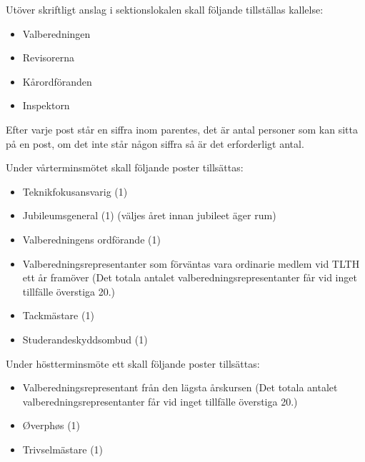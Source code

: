 \documentclass[pdfbookmarks,a4paper,11pt]{article}
\newlength{\itemcollength}
\newenvironment{reglemlista}{%
  \begin{list}{}{%
      \setlength{\labelwidth}{\itemcollength}%
      \setlength{\leftmargin}{\labelwidth + \labelsep}%
      \renewcommand{\makelabel}[1]{%
        \raisebox{0pt}[1ex][0pt]{%
          \makebox[\labelwidth][l]{%
            \parbox[t]{\itemcollength}{%
              \raggedright\hspace{0pt}##1}}}\hfill}%
      }}{%
  \end{list}}
\begin{document}
\begin{reglemlista}

	\item[Utlysande]
	Utöver skriftligt anslag i sektionslokalen skall följande tillställas kallelse:
	\begin{itemize}
		\item Valberedningen
		\item Revisorerna
		\item Kårordföranden
		\item Inspektorn
	\end{itemize}
	
	\item[Förtydligande]
	Efter varje post står en siffra inom parentes, det är antal personer som kan sitta på en post, om det inte står någon siffra så är det erforderligt antal.

	\item[Vårterminsmöte]
	Under vårterminsmötet skall följande poster tillsättas:
	\begin{itemize}

		\item Teknikfokusansvarig (1)
		\item Jubileumsgeneral (1) (väljes året innan jubileet äger rum)
		\item Valberedningens ordförande (1)
		\item  Valberedningsrepresentanter som förväntas vara ordinarie medlem vid TLTH ett år framöver (Det totala antalet valberedningsrepresentanter får vid inget tillfälle överstiga 20.)
		\item Tackmästare (1)
		\item Studerandeskyddsombud (1)
	\end{itemize}

	\item[Höstterminsmöte ett]
	Under höstterminsmöte ett skall följande poster tillsättas:
	\begin{itemize}
		\item Valberedningsrepresentant från den lägsta årskursen (Det totala
antalet valberedningsrepresentanter får vid inget tillfälle överstiga
20.)
		\item Øverphøs (1)
		\item Trivselmästare (1)
	\end{itemize}


\end{reglemlista}
\end{document}
